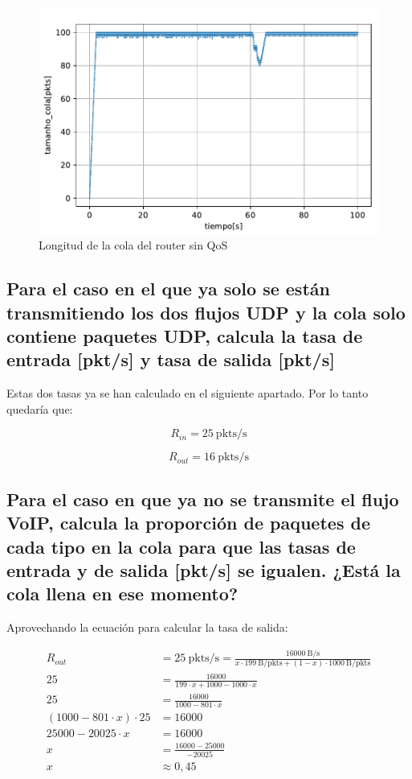 \begin{figure}[!ht]
    \centering
    \includegraphics{graficas/sinQoS/tamanho_cola_sinQoS.pdf}
    \caption{Longitud de la cola del router sin QoS}
    \label{fig:sinqos_tam}
\end{figure}

\subsection{Para el caso en el que ya solo se están transmitiendo los dos flujos UDP y la cola solo contiene paquetes
UDP, calcula la tasa de entrada [pkt/s] y tasa de salida [pkt/s]}

Estas dos tasas ya se han calculado en el siguiente apartado. Por lo tanto quedaría que:

\[
  R_{in} = 25~\mathrm{pkts/s}
\]

\[
  R_{out} = 16~\mathrm{pkts/s}
\]

\subsection{Para el caso en que ya no se transmite el flujo VoIP, calcula la proporción de paquetes de cada tipo en la
cola para que las tasas de entrada y de salida [pkt/s] se igualen. ¿Está la cola llena en ese momento?
}

Aprovechando la ecuación para calcular la tasa de salida:

\begin{equation}
    \begin{aligned}
      R_{out} &= 25~\mathrm{pkts/s} = \frac{16000~\mathrm{B/s}}{ x \cdot 199~\mathrm{B/pkts} + (1 - x) \cdot 1000~\mathrm{B/pkts}} \\
      25 &= \frac{16000}{ 199 \cdot x + 1000 - 1000 \cdot x} \\
      25 &= \frac{16000}{1000 - 801 \cdot x} \\
      (1000 - 801 \cdot x) \cdot 25 &= 16000 \\
      25000 - 20025 \cdot x &= 16000 \\
      x &= \frac{16000 - 25000}{-20025} \\
      x &\approx 0,45
    \end{aligned}
\end{equation}

